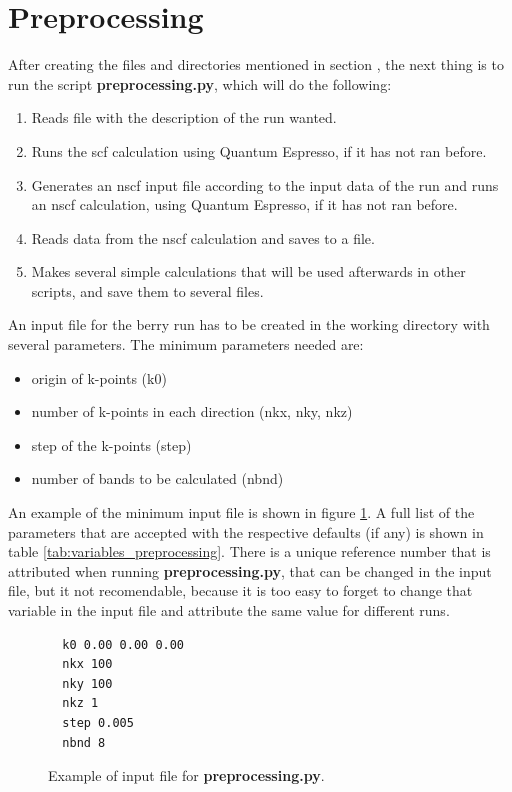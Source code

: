 \documentclass[a4paper,12pt]{report}
\begin{document}
\section{Preprocessing}\label{sec:preprocessing}
 After creating the files and directories mentioned in section , the next thing is
 to run the script \textbf{preprocessing.py}, which will do the following:
 \begin{enumerate}
  \item Reads file with the description of the run wanted.
  \item Runs the scf calculation using {\sc Quantum Espresso}, if it has not ran before.
  \item Generates an nscf input file according to the input data of the run and runs an nscf calculation,
  using {\sc Quantum Espresso}, if it has not ran before.
  \item Reads data from the nscf calculation and saves to a file.
  \item Makes several simple calculations that will be used afterwards in other scripts, and save them to several files.
 \end{enumerate}

 An input file for the berry run has to be created in the working directory with several parameters.
The minimum parameters needed are:
\begin{itemize}
 \item origin of k-points (k0)
 \item number of k-points in each direction (nkx, nky, nkz)
 \item step of the k-points (step)
 \item number of bands to be calculated (nbnd)
\end{itemize}

An example of the minimum input file is shown in figure \ref{code:inputfile}.
A full list of the parameters that are accepted with the respective defaults (if any)
is shown in table \ref{tab:variables_preprocessing}.
There is a unique reference number that is attributed when running \textbf{preprocessing.py},
that can be changed in the input file, but it not recomendable, because it is too easy to forget
to change that variable in the input file and attribute the same value for different runs.

\begin{figure}[h]
 \centering\caption{Example of input file for \textbf{preprocessing.py}.}
\begin{verbatim}
  k0 0.00 0.00 0.00
  nkx 100
  nky 100
  nkz 1
  step 0.005
  nbnd 8
\end{verbatim}
\label{code:inputfile}
\end{figure}
\end{document}
